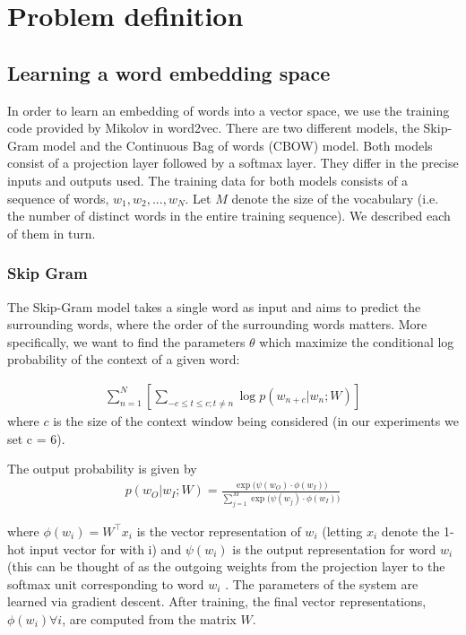 
\section{Problem definition}

\subsection{Learning a word embedding space}

In order to learn an embedding of words into a vector space, we use the training code provided by Mikolov \etal in word2vec\cite{word2vec}. There are two different models, the Skip-Gram model and the Continuous Bag of words (CBOW) model. Both models consist of a projection layer followed by a softmax layer. They differ in the precise inputs and outputs used. The training data for both models consists of a sequence of words, $w_1, w_2, ..., w_N$. Let $M$ denote the size of the vocabulary (i.e. the number of distinct words in the entire training sequence). We described each of them in turn. 

\subsubsection{Skip Gram}
The Skip-Gram model takes a single word as input and aims to predict the surrounding words, where the order of the surrounding words matters. More specifically, we want to find the parameters $\theta$ which maximize the conditional log probability of the context of a given word:

\begin{align*}
	\sum_{n=1}^{N} [\sum_{-c \leq t \leq c; t \neq n} \log p(w_{n+c} | w_n; W)]
\end{align*}
where $c$ is the size of the context window being considered (in our experiments we set c = 6). 

The output probability is given by
\begin{align*}
p(w_{O} | w_{I}; W) = \frac{ \exp \big(\psi(w_O) \cdot \phi(w_I) \big)}{\sum_{j=1}^M \exp \big(\psi(w_j) \cdot \phi(w_I) \big)}
\end{align*}


where $\phi(w_i) = W^{\top}x_i$ is the vector representation of $w_i$ (letting $x_i$ denote the 1-hot input vector for with i) and $\psi(w_i)$ is the output representation for word $w_i$ (this can be thought of as the outgoing weights from the projection layer to the softmax unit corresponding to word $w_i$ . The parameters of the system are learned via gradient descent. After training, the final vector representations, $\phi(w_i) \forall i$, are computed from the matrix $W$.



